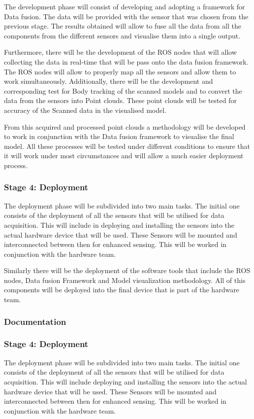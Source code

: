 \documentclass[12pt]{report}
\begin{document}
The development phase will consist of developing and adopting a framework for Data fusion. The data will be provided with the sensor that was chosen from the previous stage. 
The results obtained will allow to fuse all the data from all the components from the different sensors and visualise them into a single output.

Furthermore, there will be the development of the ROS nodes that will allow collecting the data in real-time that will be pass onto the data fusion framework.
The ROS nodes will allow to properly map all the sensors and allow them to work simultaneously. Additionally, there will be the development and corresponding test for Body tracking of the scanned models and to convert the data from the sensors into Point clouds. 
These point clouds will be tested for accuracy of the Scanned data in the visualised model. 

From this acquired and processed point clouds a methodology will be developed to work in conjunction with the Data fusion framework to visualise the final model. 
All these processes will be tested under different conditions to ensure that it will work under most circumstances and will allow a much easier deployment process. 

\subsubsection{Stage 4: Deployment}
The deployment phase will be subdivided into two main tasks. The initial one  consists of the deployment of all the sensors that will be utilised for data acquisition. 
This will include in deploying and installing the sensors into the actual hardware device that will be used. 
These Sensors will be mounted and interconnected between then for enhanced sensing. This will be worked in conjunction with the hardware team. 

Similarly there will be the deployment of the software tools that include the ROS nodes, Data fusion Framework and Model visualization methodology. 
All of this components will be deployed into the final device that is part of the hardware team. 

\subsubsection{Documentation}
\subsubsection{Stage 4: Deployment}
The deployment phase will be subdivided into two main tasks. The initial one consists of the deployment of all the sensors that will be utilised for data acquisition. 
This will include deploying and installing the sensors into the actual hardware device that will be used. 
These Sensors will be mounted and interconnected between then for enhanced sensing. This will be worked in conjunction with the hardware team. 
\end{document}
